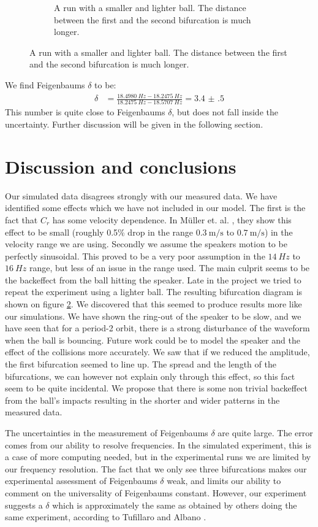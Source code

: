 \documentclass[12pt,oneside,a4paper]{article}
\numberwithin{equation}{section}
\begin{document}
{{{{\begin{figure}[h]
\begin{subfigure}[t]{0.49\textwidth}
\caption{A run with a smaller and lighter ball. The distance between the first and the second bifurcation is much longer.}
\label{long}
\end{subfigure}
\end{figure}
We find Feigenbaums $\delta$ to be:
\begin{align}
\delta &= \frac{\SI{18.4980}{Hz}-\SI{18.2475}{Hz}}{\SI{18.2475}{Hz}-\SI{18.5707}{Hz}} = \num{3.4(5)}
\end{align}
This number is quite close to Feigenbaums $\delta$, but does not fall inside the uncertainty. Further discussion will be given in the following section.  
\section{Discussion and conclusions}
\label{conclusions}
Our simulated data disagrees strongly with our measured data. We have identified some effects which we have not included in our model. The first is the fact that $C_r$ has some velocity dependence. In Müller et. al. \cite{muller}, they show this effect to be small (roughly 0.5\% drop in the range $\SI{0.3}{\meter\per\second}$ to $\SI{0.7}{\meter\per\second}$) in the velocity range we are using. Secondly we assume the speakers motion to be perfectly sinusoidal. This proved to be a very poor assumption in the $\SI{14}{Hz}$ to $\SI{16}{Hz}$ range, but less of an issue in the range used. The main culprit seems to be the backeffect from the ball hitting the speaker. Late in the project we tried to repeat the experiment using a lighter ball. The resulting bifurcation diagram is shown on figure \ref{long}. We discovered that this seemed to produce results more like our simulations. We have shown the ring-out of the speaker to be slow, and we have seen that for a period-2 orbit, there is a strong disturbance of the waveform when the ball is bouncing. Future work could be to model the speaker and the effect of the collisions more accurately. We saw that if we reduced the amplitude, the first bifurcation seemed to line up. The spread and the length of the bifurcations, we can however not explain only through this effect, so this fact seem to be quite incidental. We propose that there is some non trivial backeffect from the ball's impacts resulting in the shorter and wider patterns in the measured data. 
	
The uncertainties in the measurement of Feigenbaums $\delta$ are quite large. The error comes from our ability to resolve frequencies. In the simulated experiment, this is a case of more computing needed, but in the experimental runs we are limited by our frequency resolution. The fact that we only see three bifurcations makes our experimental assessment of Feigenbaums $\delta$ weak, and limits our ability to comment on the universality of Feigenbaums constant. However, our experiment suggests a $\delta$ which is approximately the same as obtained by others doing the same experiment, according to Tufillaro and Albano \cite{tufillaro}.
\newpage

}}}}
\end{document}
